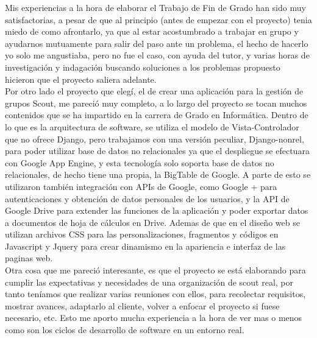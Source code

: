 



Mis experiencias a la hora de elaborar el Trabajo de Fin de Grado han sido muy satisfactorias, a pesar de que al principio 
(antes de empezar con el proyecto) tenia miedo de como afrontarlo, ya que al estar acostumbrado a trabajar en grupo y ayudarnos 
mutuamente para salir del paso ante un problema, el hecho de hacerlo yo solo me angustiaba, pero no fue el caso, con ayuda del 
tutor, y varias horas de investigación y indagación buscando soluciones a los problemas propuesto hicieron que el proyecto saliera adelante.\\

Por otro lado el proyecto que elegí, el de crear una aplicación para la gestión de grupos Scout, me pareció muy completo, a lo 
largo del proyecto se tocan muchos contenidos que se ha impartido en la carrera de Grado en Informática. Dentro de lo que es la 
arquitectura de software, se utiliza el modelo de Vista-Controlador que no ofrece Django, pero trabajamos con una versión peculiar,
Django-nonrel, para poder utilizar base de datos no relacionales ya que el despliegue se efectuara con Google App Engine, y esta tecnología 
solo soporta base de datos no relacionales, de hecho tiene una propia, la BigTable de Google. A parte de esto se utilizaron también integración 
con APIs de Google, como Google + para autenticaciones y obtención de datos personales de los usuarios, y la API de Google Drive para extender 
las funciones de la aplicación y poder exportar datos a documentos de hoja de cálculos en Drive. Ademas de que en el diseño web se utilizan 
archivos CSS para las personalizaciones, fragmentos y códigos en Javascript y Jquery para crear dinamismo en la apariencia e interfaz de las paginas web.\\

Otra cosa que me pareció interesante, es que el proyecto se está elaborando para cumplir las expectativas y necesidades de una organización de 
scout real, por tanto teníamos que realizar varias reuniones con ellos, para recolectar requisitos, mostrar avances, adaptarlo al cliente, 
volver a enfocar el proyecto si fuese necesario, etc. Esto me aporto mucha experiencia a la hora de ver mas o menos como son los ciclos de
desarrollo de software en un entorno real.\\


